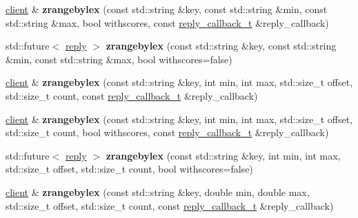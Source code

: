 \begin{DoxyCompactItemize}
\item 
\mbox{\label{classcpp__redis_1_1client_a8f299507d616c9a468a2dfedd7a572e6}} 
\hyperlink{classcpp__redis_1_1client}{client} \& {\bfseries zrangebylex} (const std\+::string \&key, const std\+::string \&min, const std\+::string \&max, bool withscores, const \hyperlink{classcpp__redis_1_1client_a061a1140d36d2eaeda82b09a0bb3f9f2}{reply\+\_\+callback\+\_\+t} \&reply\+\_\+callback)
\item 
\mbox{\label{classcpp__redis_1_1client_a8b49805661f4f73adc595258d68bc1f7}} 
std\+::future$<$ \hyperlink{classcpp__redis_1_1reply}{reply} $>$ {\bfseries zrangebylex} (const std\+::string \&key, const std\+::string \&min, const std\+::string \&max, bool withscores=false)
\item 
\mbox{\label{classcpp__redis_1_1client_a285a489ec6cc3863d38e4e6ba8c2a537}} 
\hyperlink{classcpp__redis_1_1client}{client} \& {\bfseries zrangebylex} (const std\+::string \&key, int min, int max, std\+::size\+\_\+t offset, std\+::size\+\_\+t count, const \hyperlink{classcpp__redis_1_1client_a061a1140d36d2eaeda82b09a0bb3f9f2}{reply\+\_\+callback\+\_\+t} \&reply\+\_\+callback)
\item 
\mbox{\label{classcpp__redis_1_1client_a4cc2ba0abcf9bd6440dd7e135a3bbaa8}} 
\hyperlink{classcpp__redis_1_1client}{client} \& {\bfseries zrangebylex} (const std\+::string \&key, int min, int max, std\+::size\+\_\+t offset, std\+::size\+\_\+t count, bool withscores, const \hyperlink{classcpp__redis_1_1client_a061a1140d36d2eaeda82b09a0bb3f9f2}{reply\+\_\+callback\+\_\+t} \&reply\+\_\+callback)
\item 
\mbox{\label{classcpp__redis_1_1client_a6a80eb65fe3699f645de8aef6ee51f31}} 
std\+::future$<$ \hyperlink{classcpp__redis_1_1reply}{reply} $>$ {\bfseries zrangebylex} (const std\+::string \&key, int min, int max, std\+::size\+\_\+t offset, std\+::size\+\_\+t count, bool withscores=false)
\item 
\mbox{\label{classcpp__redis_1_1client_a29e99528c5fec2fb91162e9d2e8a8faf}} 
\hyperlink{classcpp__redis_1_1client}{client} \& {\bfseries zrangebylex} (const std\+::string \&key, double min, double max, std\+::size\+\_\+t offset, std\+::size\+\_\+t count, const \hyperlink{classcpp__redis_1_1client_a061a1140d36d2eaeda82b09a0bb3f9f2}{reply\+\_\+callback\+\_\+t} \&reply\+\_\+callback)

\end{DoxyCompactItemize}
